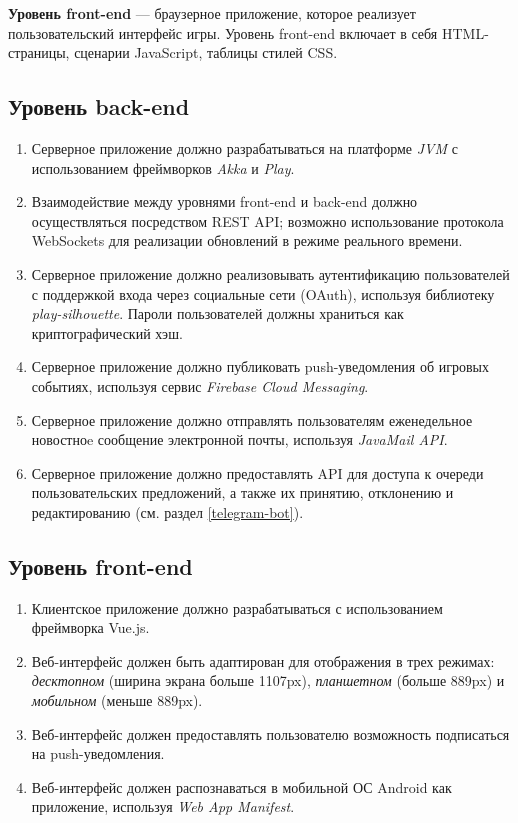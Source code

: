 \documentclass[12pt, a4paper]{article}
\begin{document}
\textbf{Уровень front-end} — браузерное приложение, которое реализует
пользовательский интерфейс игры. Уровень front-end включает в себя
HTML-страницы, сценарии JavaScript, таблицы стилей CSS.

\subsection{Уровень back-end}

\begin{enumerate}
\item Серверное приложение должно разрабатываться на платформе \textit{JVM}
с использованием фреймворков \textit{Akka} и \textit{Play}.
\item Взаимодействие между уровнями front-end и back-end должно осуществляться
посредством REST API; возможно использование протокола WebSockets для реализации
обновлений в режиме реального времени.
\item Серверное приложение должно реализовывать аутентификацию пользователей
с поддержкой входа через социальные сети (OAuth), используя библиотеку
\textit{play-silhouette}. Пароли пользователей должны храниться как
криптографический хэш.
\item Серверное приложение должно публиковать push-уведомления об игровых событиях,
используя сервис \textit{Firebase Cloud Messaging}.
\item Серверное приложение должно отправлять пользователям еженедельное новостноe
сообщение электронной почты, используя \textit{JavaMail API}.
\item Серверное приложение должно предоставлять API для доступа к очереди
пользовательских предложений, а также их принятию, отклонению и редактированию
(см. раздел \ref{telegram-bot}).
\end{enumerate}

\subsection{Уровень front-end}

\begin{enumerate}
\item Клиентское приложение должно разрабатываться с использованием фреймворка Vue.js.
\item Веб-интерфейс должен быть адаптирован для отображения в трех режимах:
\textit{десктопном} (ширина экрана больше 1107px),
\textit{планшетном} (больше 889px) и \textit{мобильном} (меньше 889px).
\item Веб-интерфейс должен предоставлять пользователю возможность подписаться на
push-уведомления.
\item Веб-интерфейс должен распознаваться в мобильной ОС Android как
приложение, используя \textit{Web App Manifest}.
\end{enumerate}
\end{document}
